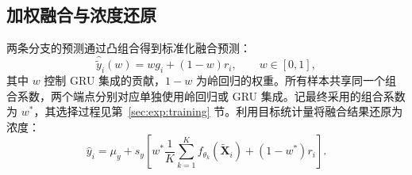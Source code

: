 \subsection{加权融合与浓度还原}
\label{sec:method:fusion}

两条分支的预测通过凸组合得到标准化融合预测：
\begin{equation}
    \widehat{\widetilde{y}}_i(w)=w g_i+(1-w)r_i,
    \qquad w\in[0,1],
    \label{eq:fusion}
\end{equation}
其中 $w$ 控制 GRU 集成的贡献，$1-w$ 为岭回归的权重。所有样本共享同一个组合系数，两个端点分别对应单独使用岭回归或 GRU 集成。记最终采用的组合系数为 $w^*$，其选择过程见第~\ref{sec:exp:training} 节。利用目标统计量将融合结果还原为浓度：
\begin{equation}
    \widehat{y}_i=\mu_y+s_y
    \left[w^*\frac{1}{K}\sum_{k=1}^{K}
    f_{\theta_k}(\widetilde{\mathbf{X}}_i)
    +(1-w^*)r_i\right].
    \label{eq:final_prediction}
\end{equation}
